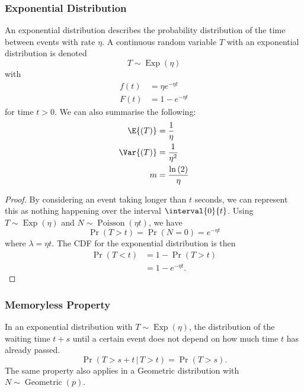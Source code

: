 \documentclass{article}
\begin{document}
\subsubsection{Exponential Distribution}
An exponential distribution describes the probability distribution of
the time between events with rate \(\eta\). A continuous random
variable \(T\) with an exponential distribution is denoted
\begin{equation*}
    T \sim \operatorname{Exp}{\left( \eta \right)}
\end{equation*}
with
\begin{align*}
    f\left( t \right) & = \eta e^{-\eta t} \\
    F\left( t \right) & = 1 - e^{-\eta t}
\end{align*}
for time \(t > 0\).
We can also summarise the following:
\begin{align*}
    \E{\left( T \right)}   & = \frac{1}{\eta}                     \\
    \Var{\left( T \right)} & = \frac{1}{\eta^2}                   \\
    m                      & = \frac{\ln{\left( 2 \right)}}{\eta}
\end{align*}
\begin{proof}
    By considering an event taking longer than \(t\) seconds, we can
    represent this as nothing happening over the interval
    \(\interval{0}{t}\). Using \(T \sim \operatorname{Exp}{\left( \eta \right)}\)
    and \(N \sim \operatorname{Poisson}{\left( \eta t \right)}\), we
    have
    \begin{equation*}
        \Pr{\left( T > t \right)} = \Pr{\left( N = 0 \right)} = e^{-\eta t}
    \end{equation*}
    where \(\lambda = \eta t\). The CDF for the exponential distribution
    is then
    \begin{align*}
        \Pr{\left( T < t \right)} & = 1 - \Pr{\left( T > t \right)} \\
                                  & = 1 - e^{-\eta t}.
    \end{align*}
\end{proof}
\subsubsection{Memoryless Property}
In an exponential distribution with \(T \sim \operatorname{Exp}{\left(
\eta \right)}\), the distribution of the waiting time \(t + s\) until a
certain event does not depend on how much time \(t\) has already
passed.
\begin{equation*}
    \Pr{\left( T > s + t \,\vert\, T > t \right)} = \Pr{\left( T > s \right)}.
\end{equation*}
The same property also applies in a Geometric distribution with \(N \sim \operatorname{Geometric}{\left( p \right)}\).
\end{document}
